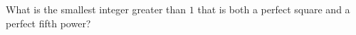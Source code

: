 What is the smallest integer greater than $1$ that is both a perfect square and a perfect fifth power?
